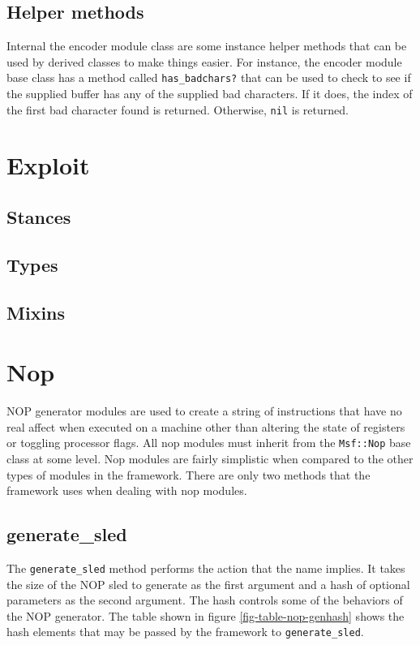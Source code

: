 \documentclass{report}
\begin{document}
        \subsection{Helper methods}

\par
Internal the encoder module class are some instance helper methods
that can be used by derived classes to make things easier.  For
instance, the encoder module base class has a method called
\texttt{has\_badchars?} that can be used to check to see if the
supplied buffer has any of the supplied bad characters.  If it does,
the index of the first bad character found is returned.  Otherwise,
\texttt{nil} is returned.

    \section{Exploit}
        \subsection{Stances}
        \subsection{Types}
        \subsection{Mixins}
    \section{Nop}

\par
NOP generator modules are used to create a string of instructions
that have no real affect when executed on a machine other than
altering the state of registers or toggling processor flags.  All
nop modules must inherit from the \texttt{Msf::Nop} base class at
some level.  Nop modules are fairly simplistic when compared to the
other types of modules in the framework.  There are only two methods
that the framework uses when dealing with nop modules.

        \subsection{generate\_sled}

\par
The \texttt{generate\_sled} method performs the action that the name
implies.  It takes the size of the NOP sled to generate as the first
argument and a hash of optional parameters as the second argument.
The hash controls some of the behaviors of the NOP generator.  The
table shown in figure \ref{fig-table-nop-genhash} shows the hash
elements that may be passed by the framework to
\texttt{generate\_sled}.
\end{document}
